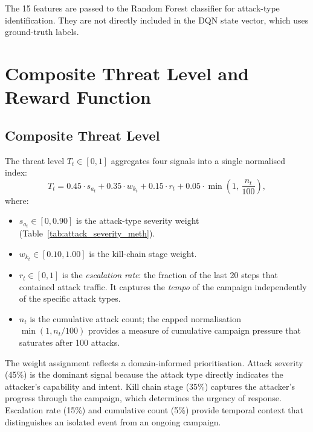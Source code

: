 The 15 features are passed to the Random Forest classifier for attack-type
identification.
They are not directly included in the DQN state vector, which uses
ground-truth labels.

\section{Composite Threat Level and Reward Function}
\label{sec:threat}

\subsection{Composite Threat Level}
\label{sec:threat_level_def}

The threat level $T_t \in [0, 1]$ aggregates four signals into a single
normalised index:
%
\begin{equation}
  T_t = 0.45 \cdot s_{a_t}
      + 0.35 \cdot w_{k_t}
      + 0.15 \cdot r_t
      + 0.05 \cdot \min\!\left(1,\, \frac{n_t}{100}\right),
  \label{eq:threat}
\end{equation}
%
where:
\begin{itemize}
  \item $s_{a_t} \in [0, 0.90]$ is the attack-type severity weight
        (Table~\ref{tab:attack_severity_meth}).
  \item $w_{k_t} \in [0.10, 1.00]$ is the kill-chain stage weight.
  \item $r_t \in [0, 1]$ is the \emph{escalation rate}: the fraction of
        the last 20 steps that contained attack traffic.
        It captures the \emph{tempo} of the campaign independently of the
        specific attack types.
  \item $n_t$ is the cumulative attack count; the capped normalisation
        $\min(1, n_t / 100)$ provides a measure of cumulative campaign
        pressure that saturates after 100 attacks.
\end{itemize}

The weight assignment reflects a domain-informed prioritisation.
Attack severity (45\%) is the dominant signal because the attack type
directly indicates the attacker's capability and intent.
Kill chain stage (35\%) captures the attacker's progress through the
campaign, which determines the urgency of response.
Escalation rate (15\%) and cumulative count (5\%) provide temporal context
that distinguishes an isolated event from an ongoing campaign.

